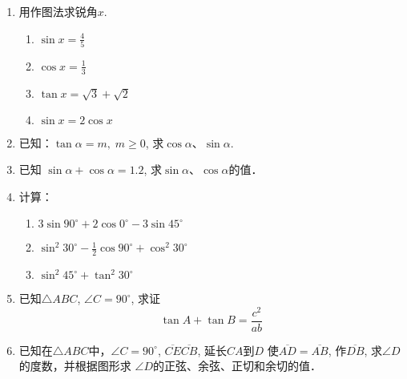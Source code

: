 \begin{enumerate}
    \item 用作图法求锐角$x$.
\begin{multicols}{2}
    \begin{enumerate}
        \item $\sin x=\frac{4}{5}$
        \item $\cos x=\frac{1}{3}$
        \item $\tan x=\sqrt{3}+\sqrt{2}$
        \item $\sin x=2\cos x$
    \end{enumerate}
\end{multicols}

\item 已知：$\tan\alpha=m,\; m\ge 0$, 求$\cos\alpha$、$\sin\alpha$.
\item 已知
   $ \sin\alpha+\cos\alpha=1.2$, 求$\sin\alpha$、$\cos\alpha$的值．
    \item 计算：
\begin{enumerate}
    \item $3\sin90^{\circ}+2\cos0^{\circ}-3\sin45^{\circ}$
    \item $\sin^2 30^{\circ}-\frac{1}{2}\cos 90^{\circ}+\cos^2 30^{\circ}$
    \item $\sin^2 45^{\circ}+\tan^2 30^{\circ}$
\end{enumerate}

    \item 已知$\triangle ABC$, $\angle C=90^{\circ}$, 求证
  \[  \tan A+\tan B=\frac{c^2}{ab}\]
    \item 已知在$\triangle ABC$中，$\angle C=90^{\circ}$, $\overline{CE}\overline{CB}$, 延长$CA$到$D$
    使$\overline{AD}=\overline{AB}$, 作$\overline{DB}$, 求$\angle D$的度数，并根据图形求
    $\angle D$的正弦、余弦、正切和余切的值．


\end{enumerate}
